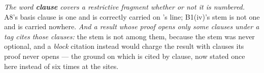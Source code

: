 \emph{The word \textbf{clause} covers a restrictive fragment whether or not it is numbered.} A8's basis
clause is one and is correctly carried on 's line; B1(iv)'s stem is not one and is
carried nowhere. \emph{And a result whose proof opens only some clauses under a tag cites those clauses:}
the stem is not among them, because the stem was never optional, and a \emph{block} citation instead
would charge the result with clauses its proof never opens --- the ground on which
 is cited by clause, now stated once here instead of six times at the sites.

%
%
%
